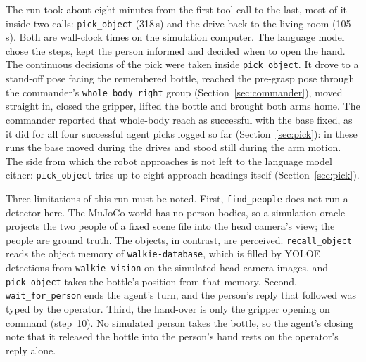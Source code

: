 \documentclass[12pt,a4paper]{article}
\begin{document}
The run took about eight minutes from the first tool call to the last, most of it inside two calls:
\texttt{pick\_object} (318\,s) and the drive back to the living room (105\,s). Both are wall-clock
times on the simulation computer. The language model chose the steps, kept the person informed and
decided when to open the hand. The continuous decisions of the pick were taken inside
\texttt{pick\_object}. It
drove to a stand-off pose facing the remembered bottle, reached the pre-grasp pose through the
commander's \texttt{whole\_body\_right} group (Section~\ref{sec:commander}), moved straight in,
closed the gripper, lifted the bottle and brought both arms home. The commander reported that
whole-body reach as successful with the base fixed, as it did for all four successful agent picks
logged so far (Section~\ref{sec:pick}): in these runs the base moved during the drives and
stood still during the arm motion.
The side from which the robot approaches is not left to the language model either:
\texttt{pick\_object} tries up to eight approach headings itself (Section~\ref{sec:pick}).

Three limitations of this run must be noted. First, \texttt{find\_people} does not run a detector
here. The MuJoCo world has no person bodies, so a simulation oracle projects the two people of a
fixed scene file into the head camera's view; the people are ground truth. The objects, in contrast,
are perceived. \texttt{recall\_object} reads the object memory of \texttt{walkie-database}, which is
filled by YOLOE~\cite{wang2025yoloe} detections from \texttt{walkie-vision} on the simulated head-camera
images, and \texttt{pick\_object} takes the bottle's position from that memory. Second,
\texttt{wait\_for\_person} ends the agent's turn, and the person's reply that followed was typed by
the operator. Third, the hand-over is only the gripper opening on command (step~10). No simulated
person takes the bottle, so the agent's closing note that it released the bottle into the person's
hand rests on the operator's reply alone.
\end{document}
